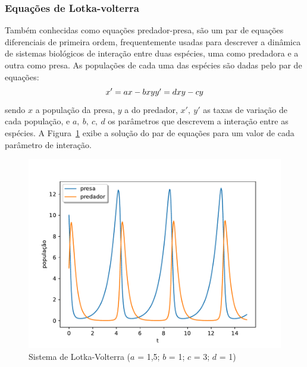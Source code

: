 \subsubsection{Equações de Lotka-volterra}
Também conhecidas como equações predador-presa, são um par de equações diferenciais de primeira ordem, frequentemente usadas para descrever a dinâmica de sistemas biológicos de interação entre duas espécies, uma como predadora e a outra como presa. As populações de cada uma das espécies são dadas pelo par de equações:
\begin{equation}\label{eq:lotka_volterra}
	x' = ax - bxy
	$$$$
	y' = dxy - cy
\end{equation}
sendo $x$ a população da presa, $y$ a do predador, $x',\ y'$ as taxas de variação de cada população, e $a,\ b,\ c,\ d$ os parâmetros que descrevem a interação entre as espécies. A Figura~\ref{fig:lotka-volterra} exibe a solução do par de equações para um valor de cada parâmetro de interação.

\begin{figure}[tb]
	\centering
	\caption{Sistema de Lotka-Volterra ($a$ = 1,5; $b$ = 1; $c$ = 3; $d$ = 1)}
	\label{fig:lotka-volterra}
	\includegraphics[width=0.6\linewidth]{figs/lotka-volterra}
\end{figure}

